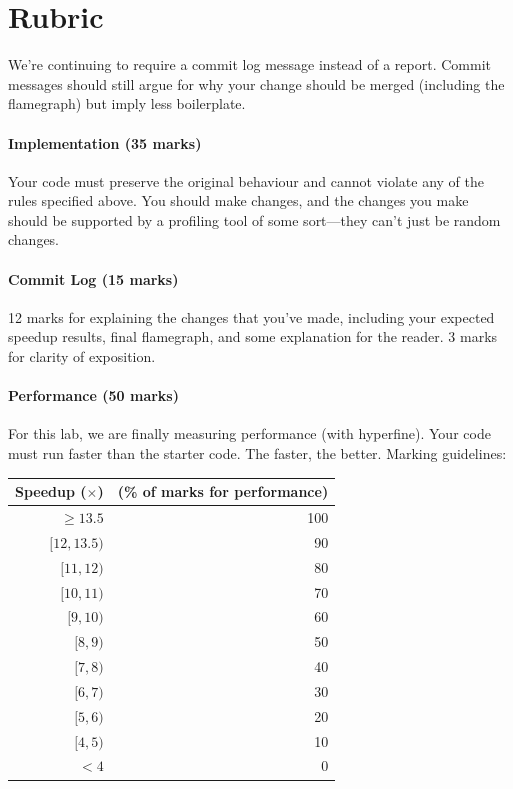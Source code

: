 \section*{Rubric}
We're continuing to require a commit log message instead of a report. Commit messages should still argue for why your change should be merged (including the flamegraph) but imply less boilerplate.

\paragraph{Implementation (35 marks)} Your code must preserve the original behaviour and cannot violate any of the rules specified above. You should make changes, and the changes you make should be supported by a profiling tool of some sort---they can't just be random changes.

\paragraph{Commit Log (15 marks)} 12 marks for explaining the changes that you've made, including your expected speedup results, final flamegraph, and some explanation for the reader. 3 marks for clarity of exposition. 

\paragraph{Performance (50 marks)} For this lab, we are finally measuring performance (with hyperfine). Your code must run faster than the starter code. The faster, the better. Marking guidelines:

\begin{center}
\begin{tabular}{r|r}
\textbf{Speedup ($\times$)} & \textbf(\% of marks for performance)\\ \hline
$\geq 13.5$ & 100\\
$[12, 13.5)$ & 90\\
$[11, 12)$ & 80\\
$[10, 11)$ & 70\\
$[9, 10)$ & 60\\
$[8, 9)$ & 50\\
$[7, 8)$ & 40 \\
$[6, 7)$ & 30\\
$[5, 6)$ & 20\\
$[4, 5)$ & 10\\
$< 4$ & 0
\end{tabular}
\end{center}

